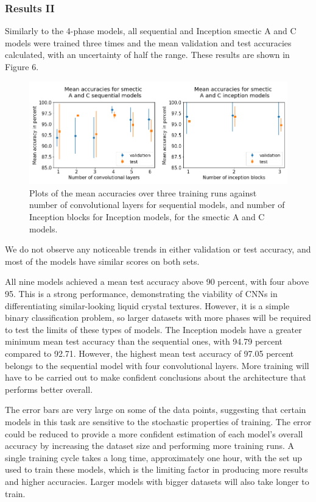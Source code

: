 \documentclass[12pt]{article}
\begin{document}
\subsubsection{Results II}
Similarly to the 4-phase models, all sequential and Inception smectic A and C models were trained three times and the mean validation and test accuracies calculated, with an uncertainty of half the range. These results are shown in Figure 6. 
\begin{figure}[!ht]
	\centering
    \includegraphics[width=5.6678in]{images/smecticAC_graphs.png}
    \caption{Plots of the mean accuracies over three training runs against number of convolutional layers for sequential models, and number of Inception blocks for Inception models, for the smectic A and C models.}
\end{figure} 
We do not observe any noticeable trends in either validation or test accuracy, and most of the models have similar scores on both sets.

All nine models achieved a mean test accuracy above 90 percent, with four above 95. This is a strong performance, demonstrating the viability of CNNs in differentiating similar-looking liquid crystal textures. However, it is a simple binary classification problem, so larger datasets with more phases will be required to test the limits of these types of models. The Inception models have a greater minimum mean test accuracy than the sequential ones, with 94.79 percent compared to 92.71. However, the highest mean test accuracy of 97.05 percent belongs to the sequential model with four convolutional layers. More training will have to be carried out to make confident conclusions about the architecture that performs better overall.

The error bars are very large on some of the data points, suggesting that certain models in this task are sensitive to the stochastic properties of training. The error could be reduced to provide a more confident estimation of each model's overall accuracy by increasing the dataset size and performing more training runs. A single training cycle takes a long time, approximately one hour, with the set up used to train these models, which is the limiting factor in producing more results and higher accuracies. Larger models with bigger datasets will also take longer to train.
\end{document}

